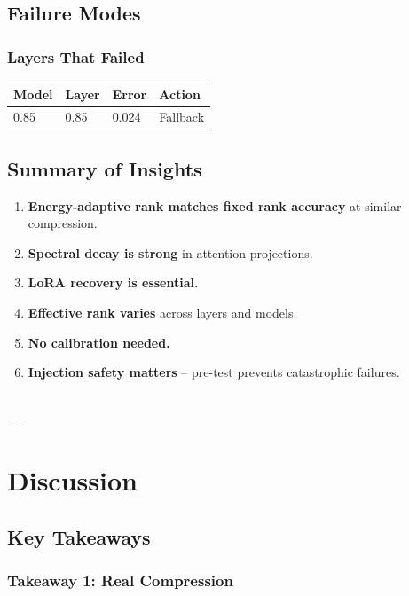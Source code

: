 \subsection{Failure Modes}

\subsubsection{Layers That Failed}

\begin{table}[H]
\centering
\small
\begin{tabular}{llll}
\toprule
\textbf{Model} & \textbf{Layer} & \textbf{Error} & \textbf{Action} \\
\midrule
0.85 & 0.85 & 0.024 & Fallback \\
\bottomrule
\end{tabular}
\end{table}

\subsection{Summary of Insights}

\begin{enumerate}
\item \textbf{Energy-adaptive rank matches fixed rank accuracy} at similar compression.
\item \textbf{Spectral decay is strong} in attention projections.
\item \textbf{LoRA recovery is essential.}
\item \textbf{Effective rank varies} across layers and models.
\item \textbf{No calibration needed.}
\item \textbf{Injection safety matters} -- pre-test prevents catastrophic failures.
\end{enumerate}
\begin{lstlisting}

---
\end{lstlisting}


\section{Discussion}

\subsection{Key Takeaways}

\subsubsection{Takeaway 1: Real Compression}

